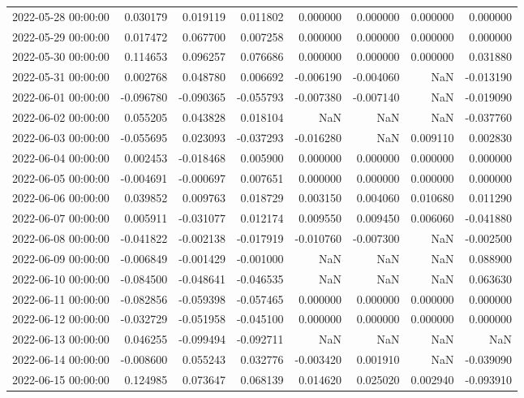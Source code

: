 \begin{tabular}{lrrrrrrr}
2022-05-28 00:00:00 & 0.030179 & 0.019119 & 0.011802 & 0.000000 & 0.000000 & 0.000000 & 0.000000 \\
2022-05-29 00:00:00 & 0.017472 & 0.067700 & 0.007258 & 0.000000 & 0.000000 & 0.000000 & 0.000000 \\
2022-05-30 00:00:00 & 0.114653 & 0.096257 & 0.076686 & 0.000000 & 0.000000 & 0.000000 & 0.031880 \\
2022-05-31 00:00:00 & 0.002768 & 0.048780 & 0.006692 & -0.006190 & -0.004060 & NaN & -0.013190 \\
2022-06-01 00:00:00 & -0.096780 & -0.090365 & -0.055793 & -0.007380 & -0.007140 & NaN & -0.019090 \\
2022-06-02 00:00:00 & 0.055205 & 0.043828 & 0.018104 & NaN & NaN & NaN & -0.037760 \\
2022-06-03 00:00:00 & -0.055695 & 0.023093 & -0.037293 & -0.016280 & NaN & 0.009110 & 0.002830 \\
2022-06-04 00:00:00 & 0.002453 & -0.018468 & 0.005900 & 0.000000 & 0.000000 & 0.000000 & 0.000000 \\
2022-06-05 00:00:00 & -0.004691 & -0.000697 & 0.007651 & 0.000000 & 0.000000 & 0.000000 & 0.000000 \\
2022-06-06 00:00:00 & 0.039852 & 0.009763 & 0.018729 & 0.003150 & 0.004060 & 0.010680 & 0.011290 \\
2022-06-07 00:00:00 & 0.005911 & -0.031077 & 0.012174 & 0.009550 & 0.009450 & 0.006060 & -0.041880 \\
2022-06-08 00:00:00 & -0.041822 & -0.002138 & -0.017919 & -0.010760 & -0.007300 & NaN & -0.002500 \\
2022-06-09 00:00:00 & -0.006849 & -0.001429 & -0.001000 & NaN & NaN & NaN & 0.088900 \\
2022-06-10 00:00:00 & -0.084500 & -0.048641 & -0.046535 & NaN & NaN & NaN & 0.063630 \\
2022-06-11 00:00:00 & -0.082856 & -0.059398 & -0.057465 & 0.000000 & 0.000000 & 0.000000 & 0.000000 \\
2022-06-12 00:00:00 & -0.032729 & -0.051958 & -0.045100 & 0.000000 & 0.000000 & 0.000000 & 0.000000 \\
2022-06-13 00:00:00 & 0.046255 & -0.099494 & -0.092711 & NaN & NaN & NaN & NaN \\
2022-06-14 00:00:00 & -0.008600 & 0.055243 & 0.032776 & -0.003420 & 0.001910 & NaN & -0.039090 \\
2022-06-15 00:00:00 & 0.124985 & 0.073647 & 0.068139 & 0.014620 & 0.025020 & 0.002940 & -0.093910 \\

\end{tabular}
